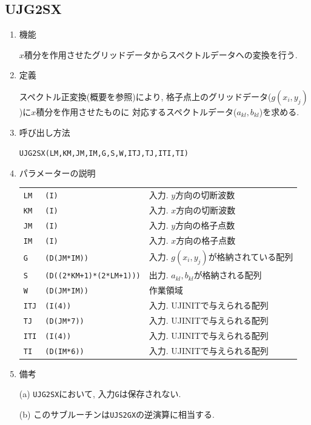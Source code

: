 \documentclass[a4j,fleqn]{jarticle}
\begin{document}

\subsection{UJG2SX}

\begin{enumerate}

\item 機能 

$x$積分を作用させたグリッドデータからスペクトルデータへの変換を行う.

\item 定義

スペクトル正変換(概要を参照)により, 
格子点上のグリッドデータ($g(x_i,y_j)$)に$x$積分を作用させたものに
対応するスペクトルデータ($a_{kl},b_{kl}$)を求める.

\item 呼び出し方法 

{\tt UJG2SX(LM,KM,JM,IM,G,S,W,ITJ,TJ,ITI,TI)}
  
\item パラメーターの説明

\begin{tabular}{lll}
{\tt LM} & {\tt (I)} & 入力. $y$方向の切断波数\\
{\tt KM} & {\tt (I)} & 入力. $x$方向の切断波数\\
{\tt JM} & {\tt (I)} & 入力. $y$方向の格子点数\\
{\tt IM} & {\tt (I)} & 入力. $x$方向の格子点数\\
{\tt G} & {\tt (D(JM*IM))} & 入力. $g(x_i,y_j)$が格納されている配列\\
{\tt S} & {\tt (D((2*KM+1)*(2*LM+1)))} & 出力. $a_{kl},b_{kl}$が格納される配列\\
{\tt W} & {\tt (D(JM*IM))} & 作業領域\\
{\tt ITJ} & {\tt (I(4))} & 入力. UJINITで与えられる配列\\
{\tt TJ} & {\tt (D(JM*7))} & 入力. UJINITで与えられる配列\\
{\tt ITI} & {\tt (I(4))} & 入力. UJINITで与えられる配列\\
{\tt TI} & {\tt (D(IM*6))} & 入力. UJINITで与えられる配列
\end{tabular}

\item 備考

(a) {\tt UJG2SX}において, 入力{\tt G}は保存されない.

(b) このサブルーチンは{\tt UJS2GX}の逆演算に相当する.


\end{enumerate}
\end{document}
